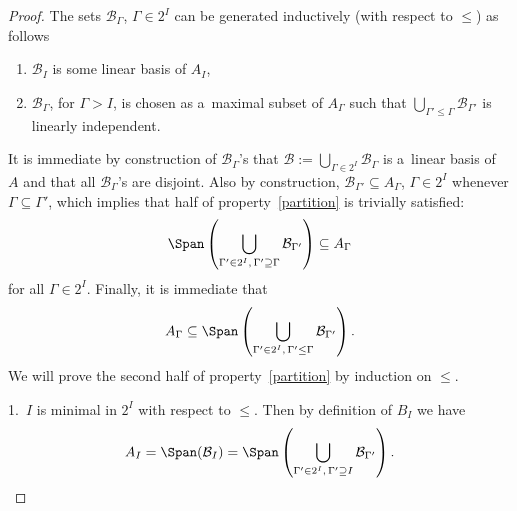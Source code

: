 \begin{proof}
The sets $\mathcal{B}_\Gamma$, $\Gamma\in2^I$ can be generated inductively (with respect to $\leq$) as follows
\begin{enumerate}\itemsep=0pt
\item[1)] $\mathcal{B}_I$ is some linear basis of $A_I$,
\item[2)] $\mathcal{B}_\Gamma$, for $\Gamma>I$, is chosen as a~maximal subset of $A_\Gamma$ such that
$\bigcup_{\Gamma'\leq\Gamma}\mathcal{B}_{\Gamma'}$ is linearly independent.
\end{enumerate}
It is immediate by construction of $\mathcal{B}_\Gamma$'s that $\mathcal{B}:=\bigcup_{\Gamma\in2^I}\mathcal{B}_\Gamma$
is a~linear basis of~$A$ and that all $\mathcal{B}_\Gamma$'s are disjoint.
Also by construction, $\mathcal{B}_{\Gamma'}\subseteq A_\Gamma$, $\Gamma\in2^I$ whenever $\Gamma\subseteq \Gamma'$,
which implies that half of property~\eqref{partition} is trivially satisf\/ied:
\begin{gather*}
\Span\left(\bigcup_{\Gamma'\in2^I,\, \Gamma'\supseteq\Gamma}\mathcal{B}_{\Gamma'}\right)\subseteq A_\Gamma
\end{gather*}
for all $\Gamma\in2^I$.
Finally, it is immediate that
\begin{gather}
\label{partition0}
A_\Gamma\subseteq\Span\left(\bigcup_{\Gamma'\in2^I,\, \Gamma'\leq\Gamma}\mathcal{B}_{\Gamma'}\right).
\end{gather}
We will prove the second half of property~\eqref{partition} by induction on $\leq$.

1.~$I$ is minimal in $2^I$ with respect to $\leq$.
Then by def\/inition of $B_I$ we have
\begin{gather*}
A_I= \Span(\mathcal{B}_I) = \Span\left(\bigcup_{\Gamma'\in2^I,\, \Gamma'\supseteq I}\mathcal{B}_{\Gamma'}\right).
\end{gather*}


\end{proof}
